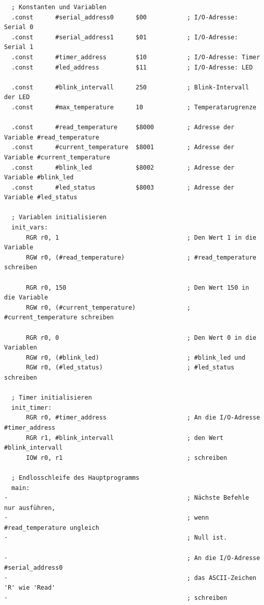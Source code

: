 {
\footnotesize

\begin{verbatim}
  ; Konstanten und Variablen
  .const      #serial_address0      $00           ; I/O-Adresse: Serial 0
  .const      #serial_address1      $01           ; I/O-Adresse: Serial 1
  .const      #timer_address        $10           ; I/O-Adresse: Timer
  .const      #led_address          $11           ; I/O-Adresse: LED

  .const      #blink_intervall      250           ; Blink-Intervall der LED
  .const      #max_temperature      10            ; Temperatarugrenze

  .const      #read_temperature     $8000         ; Adresse der Variable #read_temperature
  .const      #current_temperature  $8001         ; Adresse der Variable #current_temperature
  .const      #blink_led            $8002         ; Adresse der Variable #blink_led
  .const      #led_status           $8003         ; Adresse der Variable #led_status

  ; Variablen initialisieren
  init_vars:
      RGR r0, 1                                   ; Den Wert 1 in die Variable
      RGW r0, (#read_temperature)                 ; #read_temperature schreiben

      RGR r0, 150                                 ; Den Wert 150 in die Variable
      RGW r0, (#current_temperature)              ; #current_temperature schreiben

      RGR r0, 0                                   ; Den Wert 0 in die Variablen
      RGW r0, (#blink_led)                        ; #blink_led und
      RGW r0, (#led_status)                       ; #led_status schreiben

  ; Timer initialisieren
  init_timer:
      RGR r0, #timer_address                      ; An die I/O-Adresse #timer_address
      RGR r1, #blink_intervall                    ; den Wert #blink_intervall
      IOW r0, r1                                  ; schreiben

  ; Endlosschleife des Hauptprogramms
  main:
·                                                 ; Nächste Befehle nur ausführen,
·                                                 ; wenn #read_temperature ungleich
·                                                 ; Null ist.

·                                                 ; An die I/O-Adresse #serial_address0
·                                                 ; das ASCII-Zeichen 'R' wie 'Read'
·                                                 ; schreiben


\end{verbatim}}
